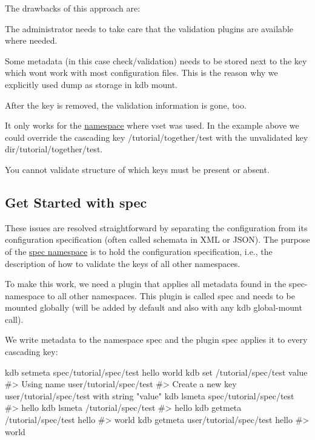 The drawbacks of this approach are\+:


\begin{DoxyItemize}
\item The administrator needs to take care that the validation plugins are available where needed.
\item Some metadata (in this case {\ttfamily check/validation}) needs to be stored next to the key which won\textquotesingle{}t work with most configuration files. This is the reason why we explicitly used {\ttfamily dump} as storage in {\ttfamily kdb mount}.
\item After the key is removed, the validation information is gone, too.
\item It only works for the \hyperlink{doc_tutorials_namespaces_md}{namespace} where {\ttfamily vset} was used. In the example above we could override the cascading key {\ttfamily /tutorial/together/test} with the unvalidated key {\ttfamily dir/tutorial/together/test}.
\item You cannot validate structure of which keys must be present or absent.
\end{DoxyItemize}

\subsection*{Get Started with {\ttfamily spec}}

These issues are resolved straightforward by separating the configuration from its configuration specification (often called schemata in X\+ML or J\+S\+ON). The purpose of the \hyperlink{doc_tutorials_namespaces_md}{spec namespace} is to hold the configuration specification, i.\+e., the description of how to validate the keys of all other namespaces.

To make this work, we need a plugin that applies all metadata found in the {\ttfamily spec}-\/namespace to all other namespaces. This plugin is called {\ttfamily spec} and needs to be mounted globally (will be added by default and also with any {\ttfamily kdb global-\/mount} call).

We write metadata to the namespace {\ttfamily spec} and the plugin {\ttfamily spec} applies it to every cascading key\+:


\begin{DoxyCode}
kdb setmeta spec/tutorial/spec/test hello world
kdb set /tutorial/spec/test value
#> Using name user/tutorial/spec/test
#> Create a new key user/tutorial/spec/test with string "value"
kdb lsmeta spec/tutorial/spec/test
#> hello
kdb lsmeta /tutorial/spec/test
#> hello
kdb getmeta /tutorial/spec/test hello
#> world
kdb getmeta user/tutorial/spec/test hello
#> world
\end{DoxyCode}


